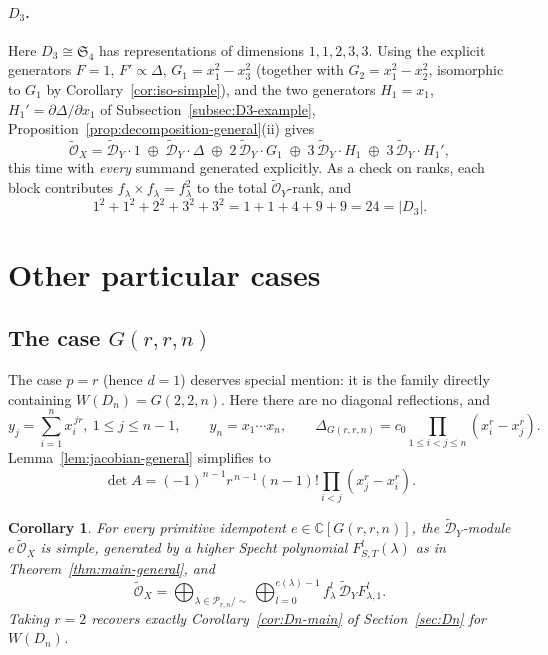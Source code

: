 \documentclass[11pt,a4paper]{article}
\newtheorem{corollary}[theorem]{Corollary}
\begin{document}
\paragraph{$D_3$.} Here $D_3 \cong \mathfrak{S}_4$ has representations
of dimensions $1,1,2,3,3$. Using the explicit generators
$F=1$, $F'\propto\Delta$, $G_1=x_1^2-x_3^2$ (together with
$G_2=x_1^2-x_2^2$, isomorphic to $G_1$ by
Corollary~\ref{cor:iso-simple}), and the two generators $H_1=x_1$,
$H_1'=\partial\Delta/\partial x_1$ of Subsection~\ref{subsec:D3-example},
Proposition~\ref{prop:decomposition-general}(ii) gives
\[
  \widetilde{\mathcal O}_X =
  \widetilde{\mathcal D}_Y\cdot 1 \;\oplus\;
  \widetilde{\mathcal D}_Y\cdot \Delta \;\oplus\;
  2\,\widetilde{\mathcal D}_Y\cdot G_1 \;\oplus\;
  3\,\widetilde{\mathcal D}_Y\cdot H_1 \;\oplus\;
  3\,\widetilde{\mathcal D}_Y\cdot H_1',
\]
this time with \emph{every} summand generated explicitly. As a check
on ranks, each block contributes $f_\lambda \times f_\lambda = f_\lambda^2$
to the total $\widetilde{\mathcal O}_Y$-rank, and
\[
  1^2 + 1^2 + 2^2 + 3^2 + 3^2 = 1+1+4+9+9 = 24 = |D_3|.
\]

\section{Other particular cases}\label{sec:other-cases}

\subsection{The case $G(r,r,n)$}\label{subsec:Grrn}

The case $p=r$ (hence $d=1$) deserves special mention: it is the
family directly containing $W(D_n)=G(2,2,n)$. Here there are no
diagonal reflections, and
\[
 y_j = \sum_{i=1}^n x_i^{\,jr},\ 1\le j\le n-1, \qquad y_n = x_1\cdots x_n,
 \qquad
 \Delta_{G(r,r,n)} = c_0\prod_{1\le i<j\le n}(x_i^r-x_j^r).
\]
Lemma~\ref{lem:jacobian-general} simplifies to
\[
 \det A = (-1)^{n-1} r^{\,n-1}(n-1)! \prod_{i<j}(x_j^r-x_i^r).
\]

\begin{corollary}\label{cor:Grrn}
For every primitive idempotent $e \in \mathbb{C}[G(r,r,n)]$, the
$\widetilde{\mathcal{D}}_Y$-module $e\,\widetilde{\mathcal{O}}_X$ is simple, generated by a
higher Specht polynomial $F^l_{S,T}(\lambda)$ as in
Theorem~\ref{thm:main-general}, and
\[
 \widetilde{\mathcal{O}}_X = \bigoplus_{\lambda \in \mathcal{P}_{r,n}/\sim}
 \bigoplus_{l=0}^{e(\lambda)-1} f^l_\lambda \,
 \widetilde{\mathcal{D}}_Y F^l_{\lambda,1}.
\]
Taking $r=2$ recovers exactly Corollary~\ref{cor:Dn-main} of Section~\ref{sec:Dn}
for $W(D_n)$.
\end{corollary}
\end{document}
